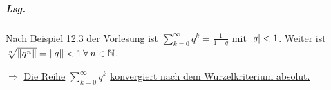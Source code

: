 \documentclass{scrreprt}
\begin{document}
\subparagraph{Lsg.} Nach Beispiel 12.3 der Vorlesung ist
$\displaystyle \sum_{k = 0}^{\infty} q^k = \frac{1}{1 - q}$ mit
$\abs{q} < 1$.
Weiter ist $\sqrt[n]{\norm{q^n}} = \norm{q} < 1 \, \forall \, n \in \mathbb{N}$.

$\Rightarrow$ \underline{Die Reihe} $\displaystyle \sum_{k = 0}^{\infty} q^k$
\underline{konvergiert nach dem Wurzelkriterium absolut.}

\end{document}
